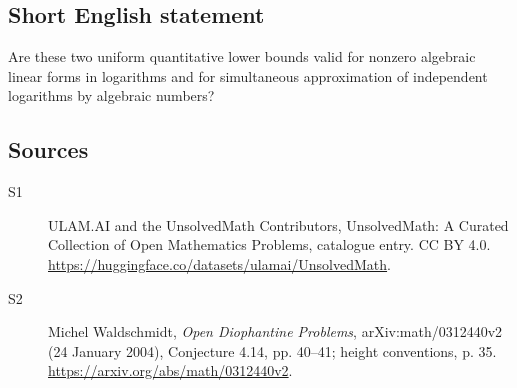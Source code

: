 \documentclass[11pt]{article}
\begin{document}
\subsection{Short English statement}
Are these two uniform quantitative lower bounds valid for nonzero algebraic linear forms in logarithms and for simultaneous approximation of independent logarithms by algebraic numbers?
\subsection{Sources}
\begin{description}
\item[\hypertarget{source:statement:1}{S1}] ULAM.AI and the UnsolvedMath Contributors, UnsolvedMath: A Curated Collection of Open Mathematics Problems, catalogue entry. CC BY 4.0. \url{https://huggingface.co/datasets/ulamai/UnsolvedMath}.
\item[\hypertarget{source:statement:2}{S2}] Michel Waldschmidt, \emph{Open Diophantine Problems}, arXiv:math/0312440v2 (24 January 2004), Conjecture 4.14, pp. 40--41; height conventions, p. 35. \url{https://arxiv.org/abs/math/0312440v2}.
\end{description}
\label{end:statement}
\end{document}
